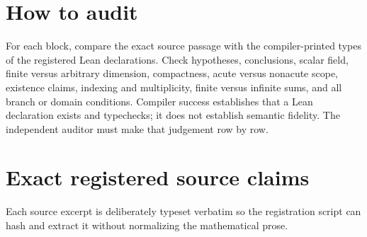\section*{How to audit}
For each block, compare the exact source passage with the compiler-printed types of the registered Lean declarations.  Check hypotheses, conclusions, scalar field, finite versus arbitrary dimension, compactness, acute versus nonacute scope, existence claims, indexing and multiplicity, finite versus infinite sums, and all branch or domain conditions.  Compiler success establishes that a Lean declaration exists and typechecks; it does not establish semantic fidelity.  The independent auditor must make that judgement row by row.

\section{Exact registered source claims}
Each source excerpt is deliberately typeset verbatim so the registration script can hash and extract it without normalizing the mathematical prose.

